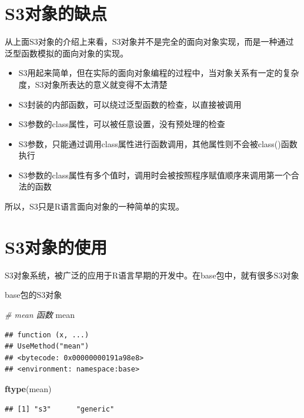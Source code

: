 \documentclass[]{book}
\newenvironment{Shaded}{\begin{snugshade}}{\end{snugshade}}
\newcommand{\KeywordTok}[1]{\textcolor[rgb]{0.13,0.29,0.53}{\textbf{#1}}}
\newcommand{\CommentTok}[1]{\textcolor[rgb]{0.56,0.35,0.01}{\textit{#1}}}
\newcommand{\NormalTok}[1]{#1}
\begin{document}
\section{S3对象的缺点}\label{s3}

从上面S3对象的介绍上来看，S3对象并不是完全的面向对象实现，而是一种通过泛型函数模拟的面向对象的实现。

\begin{itemize}
\item
  S3用起来简单，但在实际的面向对象编程的过程中，当对象关系有一定的复杂度，S3对象所表达的意义就变得不太清楚
\item
  S3封装的内部函数，可以绕过泛型函数的检查，以直接被调用
\item
  S3参数的class属性，可以被任意设置，没有预处理的检查
\item
  S3参数，只能通过调用class属性进行函数调用，其他属性则不会被class()函数执行
\item
  S3参数的class属性有多个值时，调用时会被按照程序赋值顺序来调用第一个合法的函数
\end{itemize}

所以，S3只是R语言面向对象的一种简单的实现。

\section{S3对象的使用}\label{s3}

S3对象系统，被广泛的应用于R语言早期的开发中。在base包中，就有很多S3对象

base包的S3对象

\begin{Shaded}
\begin{Highlighting}[]
\CommentTok{# mean 函数}
\NormalTok{mean}
\end{Highlighting}
\end{Shaded}

\begin{verbatim}
## function (x, ...) 
## UseMethod("mean")
## <bytecode: 0x00000000191a98e8>
## <environment: namespace:base>
\end{verbatim}

\begin{Shaded}
\begin{Highlighting}[]
\KeywordTok{ftype}\NormalTok{(mean)}
\end{Highlighting}
\end{Shaded}

\begin{verbatim}
## [1] "s3"      "generic"
\end{verbatim}
\end{document}
